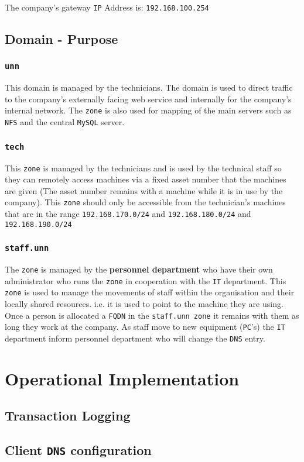 \documentclass[11pt]{article}
\begin{document}
The company’s gateway \texttt{IP} Address is: \texttt{192.168.100.254}

\subsection{Domain - Purpose}

\subsubsection{\texttt{unn}}
This domain is managed by the technicians. The domain is used to direct traffic to the company’s externally facing web service and internally 
for the company’s internal network. The \texttt{zone} is also used for mapping of the main servers such as \texttt{NFS} and the central \texttt{MySQL} server. 

\subsubsection{\texttt{tech}}
This \texttt{zone} is managed by the technicians and is used by the technical staff so they can remotely access machines via a fixed asset number that 
the machines are given (The asset number remains with a machine while it is in use by the company). This \texttt{zone} should only be accessible from 
the technician’s machines that are in the range \texttt{192.168.170.0/24} and \texttt{192.168.180.0/24} and \texttt{192.168.190.0/24}

\subsubsection{\texttt{staff.unn}}
The \texttt{zone} is managed by the \textbf{personnel department} who have their own administrator who runs the \texttt{zone} in cooperation with the \texttt{IT} 
department. This \texttt{zone} is used to manage the movements of staff within the organisation and their locally shared resources. i.e. it is used to point 
to the machine they are using. Once a person is allocated a \texttt{FQDN} in the \texttt{staff.unn zone} it remains with them as long they work at the company. 
As staff move to new equipment (\texttt{PC}’s) the \texttt{IT} department inform personnel department who will change the \texttt{DNS} entry.

\section{Operational Implementation}
\subsection{Transaction Logging}
\subsection{Client \texttt{DNS} configuration}
\end{document}
